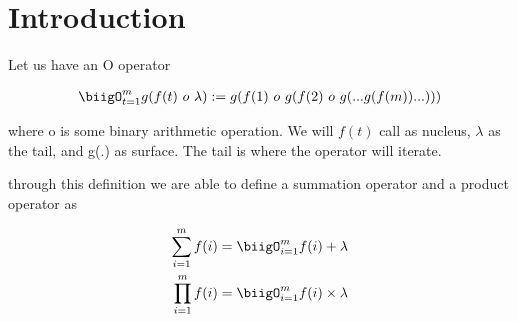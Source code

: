 \section{Introduction}

\begin{definition}
      Let us have an O  operator
      
      \begin{align}
            \biigO_{t = 1}^m g(f(t) \ o \  
            \lambda) := g(f(1) \ o \  g(f(2)
            \ o \   g(... g(f(m) )...)))
      \end{align}
      
      where o is some binary arithmetic operation. 
      We will \(f(t)\) call as nucleus, \(\lambda\)
      as the tail, and g(.) as surface. The tail is
      where the operator will iterate.
\end{definition}

through this definition we are able
to define a summation operator and
a product operator as

\begin{align}
      \sum_{i=1}^m f(i) &= \biigO_{i=1}^m f(i) + \lambda \\
      \prod_{i=1}^m f(i) &= \biigO_{i=1}^m f(i)\times \lambda
\end{align}
